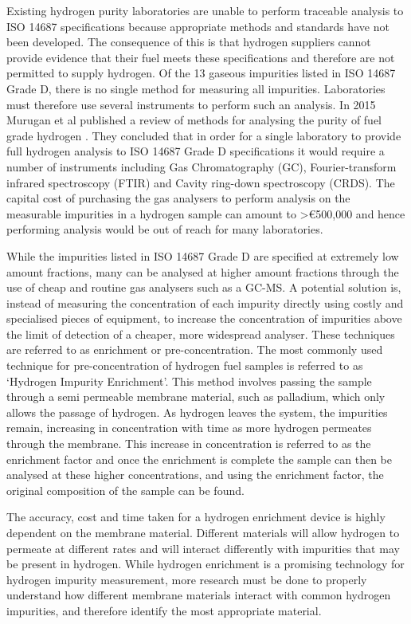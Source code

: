 Existing hydrogen purity laboratories are unable to perform traceable analysis to ISO 14687 
specifications because appropriate methods and standards have not been developed. The consequence 
of this is that hydrogen suppliers cannot provide evidence that their fuel meets these specifications and therefore are not permitted to supply hydrogen. Of the 13 gaseous impurities listed in 
ISO 14687 Grade D, there is no single method for measuring all impurities. Laboratories must therefore use 
several instruments to perform such an analysis.  In 2015 Murugan et al published a review of methods 
for analysing the purity of fuel grade hydrogen \cite{Murugan2015}. They concluded that in order for a single laboratory to provide full hydrogen analysis to ISO 14687 Grade D specifications it would require 
a number of instruments including Gas Chromatography (GC), Fourier-transform infrared spectroscopy (FTIR) and Cavity ring-down spectroscopy (CRDS). The capital cost of purchasing the gas 
analysers to perform analysis on the measurable impurities in a hydrogen sample can amount to 
>€500,000 \cite{Murugan2015} and hence performing analysis would be out of reach for many 
laboratories. 

While the impurities listed in ISO 14687 Grade D are specified at extremely low amount fractions, 
many can be analysed at higher amount fractions through the use of cheap and routine gas 
analysers such as a GC-MS. A potential solution is, instead of measuring the concentration of each impurity directly using costly and specialised pieces of equipment, to increase the concentration of impurities above the limit of detection of a cheaper, more widespread analyser. These techniques are referred 
to as enrichment or pre-concentration. The most commonly used technique for pre-concentration 
of hydrogen fuel samples is referred to as ‘Hydrogen Impurity Enrichment’. This method involves 
passing the sample through a semi permeable membrane material, such as palladium, which only allows the passage of hydrogen.\cite{NathanW.Ockwig2007a} As hydrogen leaves the system, the impurities remain, increasing in concentration with time as more hydrogen permeates through the membrane. This increase in concentration is referred to as the enrichment factor and once the enrichment is complete the sample can then be analysed at these higher concentrations, and using the enrichment factor, the original composition of the sample can be found. 

The accuracy, cost and time taken for a hydrogen enrichment device is highly dependent on the membrane material. Different materials will allow hydrogen to permeate at different rates and will interact differently with impurities that may be present in hydrogen.\cite{NathanW.Ockwig2007a} While hydrogen enrichment is a promising technology for hydrogen impurity measurement, more research must be done to properly understand how different membrane materials interact with common hydrogen impurities, and therefore identify the most appropriate material.

